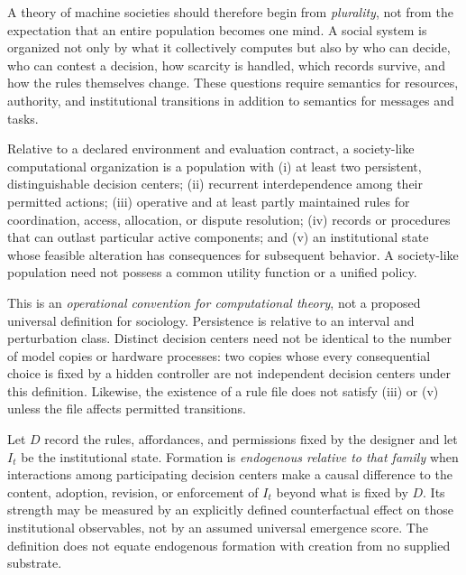 A theory of machine societies should therefore begin from \emph{plurality}, not from the expectation that an entire population becomes one mind. A social system is organized not only by what it collectively computes but also by who can decide, who can contest a decision, how scarcity is handled, which records survive, and how the rules themselves change. These questions require semantics for resources, authority, and institutional transitions in addition to semantics for messages and tasks.

\begin{MSdefinition}\label{MS:def:society}
Relative to a declared environment and evaluation contract, a society-like computational organization is a population with (i) at least two persistent, distinguishable decision centers; (ii) recurrent interdependence among their permitted actions; (iii) operative and at least partly maintained rules for coordination, access, allocation, or dispute resolution; (iv) records or procedures that can outlast particular active components; and (v) an institutional state whose feasible alteration has consequences for subsequent behavior. A society-like population need not possess a common utility function or a unified policy.
\end{MSdefinition}

This is an \emph{operational convention for computational theory}, not a proposed universal definition for sociology. Persistence is relative to an interval and perturbation class. Distinct decision centers need not be identical to the number of model copies or hardware processes: two copies whose every consequential choice is fixed by a hidden controller are not independent decision centers under this definition. Likewise, the existence of a rule file does not satisfy (iii) or (v) unless the file affects permitted transitions.

\begin{MSdefinition}\label{MS:def:endogenous}
Let $D$ record the rules, affordances, and permissions fixed by the designer and let $I_t$ be the institutional state. Formation is \emph{endogenous relative to that family} when interactions among participating decision centers make a causal difference to the content, adoption, revision, or enforcement of $I_t$ beyond what is fixed by $D$. Its strength may be measured by an explicitly defined counterfactual effect on those institutional observables, not by an assumed universal emergence score. The definition does not equate endogenous formation with creation from no supplied substrate.
\end{MSdefinition}

